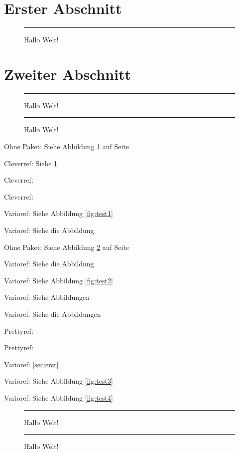 \documentclass[ngerman]{scrartcl}
\begin{document}
 \label{aaa}
\section{Erster Abschnitt}\label{sec:erst}
 
\blindtext[3]
 
\begin{figure}[h]%
\rule{\columnwidth}{5cm}
\caption{Hallo Welt!}%
\label{fig:test1}%
\end{figure}
 
\blindtext[1]
 
\section{Zweiter Abschnitt}
 
\blindtext[1]
 
\begin{figure}[h]%
\rule{\columnwidth}{5cm}
\caption{Hallo Welt!}%
\label{fig:test2}%
\end{figure}
 
\blindtext[1]
 
\begin{figure}%
\rule{\columnwidth}{5cm}
\caption{Hallo Welt!}%
\label{fig:hier}%
\end{figure}
 
\begin{compactitem}
	\item Ohne Paket: Siehe Abbildung \ref{fig:test1} auf Seite \pageref{fig:test1}
	\item Cleverref: Siehe \cref{fig:test1}
	\item Cleverref: 
	\item Cleverref: 
	\item Varioref: Siehe Abbildung \vref{fig:test1}
	\item Varioref: Siehe die Abbildung 
	\item Ohne Paket: Siehe Abbildung \ref{fig:test2} auf Seite \pageref{fig:test2} 
	\item Varioref: Siehe die Abbildung 
	\item Varioref: Siehe Abbildung \vref{fig:test2}
	\item Varioref: Siehe Abbildungen 
	\item Varioref: Siehe die Abbildungen 
	\item Prettyref: 
	\item Prettyref: 
	\item Varioref: \vref{sec:erst}
	\item Varioref: Siehe Abbildung \vref{fig:test3}
	\item Varioref: Siehe Abbildung \vref{fig:test4}
\end{compactitem}


 
\clearpage 
 
\begin{figure}%
\rule{\columnwidth}{5cm}
\caption{Hallo Welt!}%
\label{fig:test3}%
\end{figure}
 
\clearpage 
 
\begin{figure}%
\rule{\columnwidth}{5cm}
\caption{Hallo Welt!}%
\label{fig:test4}%
\end{figure}
 
\end{document}
